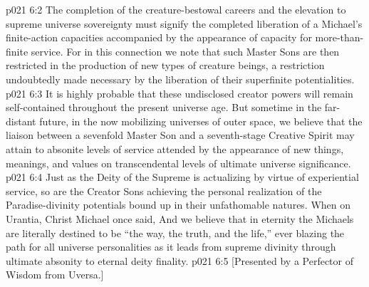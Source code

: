 \vs p021 6:2 The completion of the creature\hyp{}bestowal careers and the elevation to supreme universe sovereignty must signify the completed liberation of a Michael’s finite\hyp{}action capacities accompanied by the appearance of capacity for more\hyp{}than\hyp{}finite service. For in this connection we note that such Master Sons are then restricted in the production of new types of creature beings, a restriction undoubtedly made necessary by the liberation of their superfinite potentialities.
\vs p021 6:3 It is highly probable that these undisclosed creator powers will remain self\hyp{}contained throughout the present universe age. But sometime in the far\hyp{}distant future, in the now mobilizing universes of outer space, we believe that the liaison between a sevenfold Master Son and a seventh\hyp{}stage Creative Spirit may attain to absonite levels of service attended by the appearance of new things, meanings, and values on transcendental levels of ultimate universe significance.
\vs p021 6:4 Just as the Deity of the Supreme is actualizing by virtue of experiential service, so are the Creator Sons achieving the personal realization of the Paradise\hyp{}divinity potentials bound up in their unfathomable natures. When on Urantia, Christ Michael once said,  And we believe that in eternity the Michaels are literally destined to be “the way, the truth, and the life,” ever blazing the path for all universe personalities as it leads from supreme divinity through ultimate absonity to eternal deity finality.
\vsetoff
\vs p021 6:5 [Presented by a Perfector of Wisdom from Uversa.]
\quizlink
